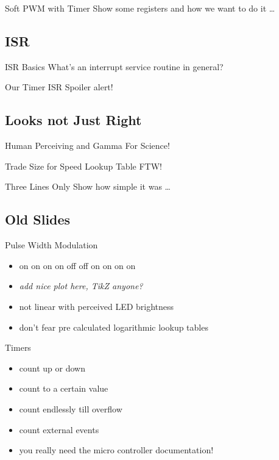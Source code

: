 \documentclass{beamer}
\begin{document}
\begin{frame}{Soft PWM with Timer}
    Show some registers and how we want to do it …
\end{frame}

\subsection{ISR}

\begin{frame}{ISR Basics}
    What's an interrupt service routine in general?
\end{frame}

\begin{frame}{Our Timer ISR}
    Spoiler alert!
\end{frame}

\subsection{Looks not Just Right}

\begin{frame}{Human Perceiving and Gamma}
    For Science!
\end{frame}

\begin{frame}{Trade Size for Speed}
    Lookup Table FTW!
\end{frame}

\begin{frame}{Three Lines Only}
    Show how simple it was …
\end{frame}

\subsection{Old Slides}

\begin{frame}{Pulse Width Modulation}
    \begin{itemize}
        \item on on on on off off on on on on
        \pause
        \item \emph{add nice plot here, TikZ anyone?}
        \pause
        \item not linear with perceived LED brightness
        \item don't fear pre calculated logarithmic lookup tables
    \end{itemize}
\end{frame}

\begin{frame}{Timers}
    \begin{itemize}
        \item count up or down
        \item count to a certain value
        \item count endlessly till overflow
        \item count external events
        \pause
        \item you really need the micro controller documentation!
    \end{itemize}
\end{frame}
\end{document}
